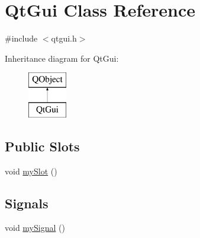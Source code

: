 \hypertarget{classQtGui}{}\section{Qt\+Gui Class Reference}
\label{classQtGui}


{\ttfamily \#include $<$qtgui.\+h$>$}

Inheritance diagram for Qt\+Gui\+:\begin{figure}[H]
\begin{center}
\leavevmode
\includegraphics[height=2.000000cm]{classQtGui}
\end{center}
\end{figure}
\subsection*{Public Slots}
\begin{DoxyCompactItemize}
\item 
void \mbox{\hyperlink{classQtGui_a22b8a1caa164dc9333b18859137a7e84}{my\+Slot}} ()
\end{DoxyCompactItemize}
\subsection*{Signals}
\begin{DoxyCompactItemize}
\item 
void \mbox{\hyperlink{classQtGui_a2bcfdc8e485c8204ce10442882aa3563}{my\+Signal}} ()
\end{DoxyCompactItemize}
